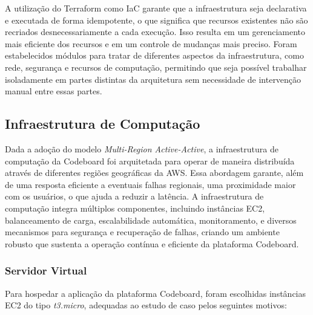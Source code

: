 A utilização do Terraform como IaC garante que a infraestrutura seja declarativa e executada de forma idempotente, o que significa que recursos existentes não são recriados desnecessariamente a cada execução. Isso resulta em um gerenciamento mais eficiente dos recursos e em um controle de mudanças mais preciso. Foram estabelecidos módulos para tratar de diferentes aspectos da infraestrutura, como rede, segurança e recursos de computação, permitindo que seja possível trabalhar isoladamente em partes distintas da arquitetura sem necessidade de intervenção manual entre essas partes.


\subsection{Infraestrutura de Computação}

Dada a adoção do modelo \emph{Multi-Region Active-Active}, a infraestrutura de computação da Codeboard foi arquitetada para operar de maneira distribuída através de diferentes regiões geográficas da AWS. Essa abordagem garante, além de uma resposta eficiente a eventuais falhas regionais, uma proximidade maior com os usuários, o que ajuda a reduzir a latência. A infraestrutura de computação integra múltiplos componentes, incluindo instâncias EC2, balanceamento de carga, escalabilidade automática, monitoramento, e diversos mecanismos para segurança e recuperação de falhas, criando um ambiente robusto que sustenta a operação contínua e eficiente da plataforma Codeboard.

\subsubsection{Servidor Virtual}

Para hospedar a aplicação da plataforma Codeboard, foram escolhidas instâncias EC2 do tipo \emph{t3.micro}, adequadas ao estudo de caso pelos seguintes motivos: 

